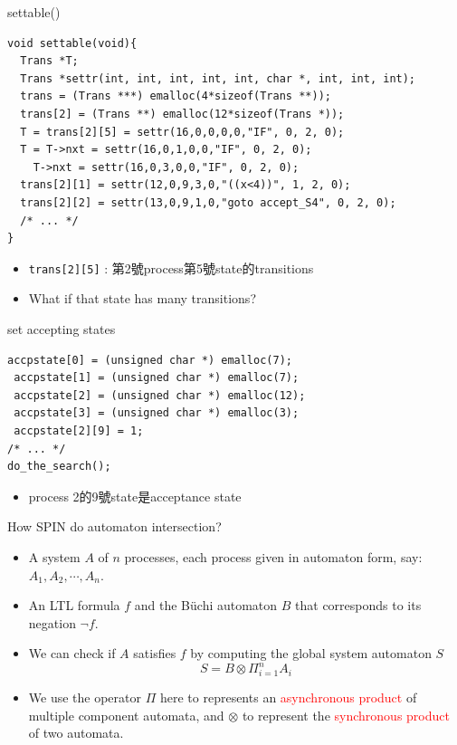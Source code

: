 \documentclass[12pt]{beamer}
\newcommand{\code}[1]{\texttt{#1}}
\begin{document}
\begin{frame}[fragile]{settable()}
\begin{lstlisting}[basicstyle=\footnotesize\ttfamily]
void settable(void){ 
  Trans *T;
  Trans *settr(int, int, int, int, int, char *, int, int, int);
  trans = (Trans ***) emalloc(4*sizeof(Trans **));
  trans[2] = (Trans **) emalloc(12*sizeof(Trans *));
  T = trans[2][5] = settr(16,0,0,0,0,"IF", 0, 2, 0);
  T = T->nxt = settr(16,0,1,0,0,"IF", 0, 2, 0);
    T->nxt = settr(16,0,3,0,0,"IF", 0, 2, 0);
  trans[2][1] = settr(12,0,9,3,0,"((x<4))", 1, 2, 0);
  trans[2][2] = settr(13,0,9,1,0,"goto accept_S4", 0, 2, 0);
  /* ... */
}
\end{lstlisting}
\begin{itemize}
	\item \code{trans[2][5]} : 第2號process第5號state的transitions
	\item What if that state has many transitions? \only<2>{Linked list can help.}
\end{itemize}
\end{frame}

\begin{frame}[fragile]{set accepting states}
\begin{lstlisting}[basicstyle=\normalsize\ttfamily]   
 accpstate[0] = (unsigned char *) emalloc(7);
 accpstate[1] = (unsigned char *) emalloc(7);
 accpstate[2] = (unsigned char *) emalloc(12);
 accpstate[3] = (unsigned char *) emalloc(3);
 accpstate[2][9] = 1;
/* ... */
do_the_search();
\end{lstlisting}
\begin{itemize}
	\item process 2的9號state是acceptance state
\end{itemize}
\end{frame}

\begin{frame}{How SPIN do automaton intersection?}
\begin{itemize}
	\item A system $A$ of $n$ processes, each process given in automaton form, say: $A_{1}, A_{2}, \cdots, A_{n}$.
	\item An LTL formula $f$ and the Büchi automaton $B$ that corresponds to its negation $\neg f$.
	\item We can check if $A$ satisfies $f$ by computing the global system automaton $S$
	$$S = B \otimes \Pi_{i=1}^{n}A_{i}$$
	\item We use the operator $\Pi$ here to represents an \textcolor{red}{asynchronous product} of multiple component automata, and $\otimes$ to represent the \textcolor{red}{synchronous product} of two automata.
\end{itemize}
\end{frame}
\end{document}
